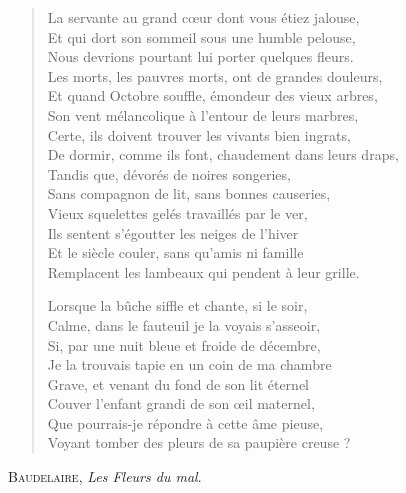 \documentclass[14pt,a4paper,french]{scrartcl}
\begin{document}
\thispagestyle{empty}

\settowidth{\versewidth}{La servante au grand cœur dont vous étiez jalouse,}

\begin{verse}
La servante au grand cœur dont vous étiez jalouse,\\
Et qui dort son sommeil sous une humble pelouse,\\
Nous devrions pourtant lui porter quelques fleurs.\\
Les morts, les pauvres morts, ont de grandes douleurs,\\
Et quand Octobre souffle, émondeur des vieux arbres,\\
Son vent mélancolique à l’entour de leurs marbres,\\
Certe, ils doivent trouver les vivants bien ingrats,\\
De dormir, comme ils font, chaudement dans leurs draps,\\
Tandis que, dévorés de noires songeries,\\
Sans compagnon de lit, sans bonnes causeries,\\
Vieux squelettes gelés travaillés par le ver,\\
Ils sentent s’égoutter les neiges de l’hiver\\
Et le siècle couler, sans qu’amis ni famille\\
Remplacent les lambeaux qui pendent à leur grille.

Lorsque la bûche siffle et chante, si le soir,\\
Calme, dans le fauteuil je la voyais s’asseoir,\\
Si, par une nuit bleue et froide de décembre,\\
Je la trouvais tapie en un coin de ma chambre\\
Grave, et venant du fond de son lit éternel\\
Couver l’enfant grandi de son œil maternel,\\
Que pourrais-je répondre à cette âme pieuse,\\
Voyant tomber des pleurs de sa paupière creuse ?
\end{verse}

\begin{flushright}
\large
\textsc{Baudelaire}, \textit{Les Fleurs du mal}.
\end{flushright}
\end{document}
